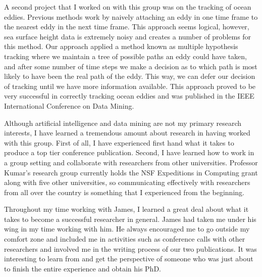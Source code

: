 \documentclass[12pt]{article}
\begin{document}

A second project that I worked on with this group was on the tracking of ocean eddies. Previous methods work by naively attaching an eddy in one time frame to the nearest eddy in the next time frame. This approach seems logical, however, sea surface height data is extremely noisy and creates a number of problems for this method.  Our approach applied a method known as multiple hypothesis tracking where we maintain a tree of possible paths an eddy could have taken, and after some number of time steps we make a decision as to which path is most likely to have been the real path of the eddy. This way, we can defer our decision of tracking until we have more information available. This approach proved to be very successful in correctly tracking ocean eddies and was published in the IEEE International Conference on Data Mining.

Although artificial intelligence and data mining are not my primary research interests, I have learned a tremendous amount about research in having worked with this group. First of all, I have experienced first hand what it takes to produce a top tier conference publication. Second, I have learned how to work in a group setting and collaborate with researchers from other universities. Professor Kumar's research group currently holds the NSF Expeditions in Computing grant along with five other universities, so communicating effectively with researchers from all over the country is something that I experienced from the beginning.

Throughout my time working with James, I learned a great deal about what it takes to become a successful researcher in general. James had taken me under his wing in my time working with him. He always encouraged me to go outside my comfort zone and included me in activities such as conference calls with other researchers and involved me in the writing process of our two publications. It was interesting to learn from and get the perspective of someone who was just about to finish the entire experience and obtain his PhD.
\end{document}
